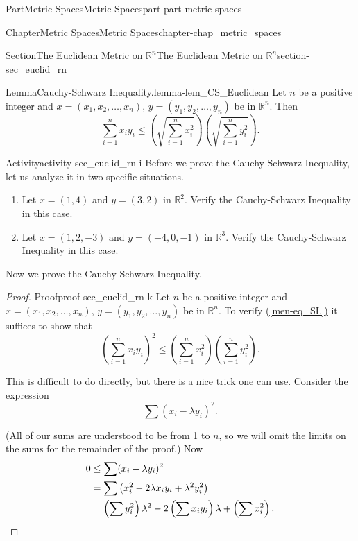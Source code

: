 \documentclass[oneside,10pt,]{book}
\newcommand{\xreffont}{\relax}
\numberwithin{equation}{chapter}
\newcommand{\R}{\mathbb{R}}
\newcommand{\amp}{&}
\begin{document}
\begin{partptx}{Part}{Metric Spaces}{}{Metric Spaces}{}{}{part-part-metric-spaces}
\begin{chapterptx}{Chapter}{Metric Spaces}{}{Metric Spaces}{}{}{chapter-chap_metric_spaces}
\begin{sectionptx}{Section}{The Euclidean Metric on \(\R^n\)}{}{The Euclidean Metric on \(\R^n\)}{}{}{section-sec_euclid_rn}
\begin{lemma}{Lemma}{Cauchy-Schwarz Inequality.}{}{lemma-lem_CS_Euclidean}
Let \(n\) be a positive integer and \(x = (x_1, x_2, \ldots,
x_n)\), \(y=(y_1, y_2, \ldots, y_n)\) be in \(\R^n\). Then%
\begin{equation}
\sum_{i=1}^n x_iy_i \leq  \left(\sqrt{\sum_{i=1}^n x_i^2}\right) \left(\sqrt{\sum_{i=1}^n y_i^2}\right)\text{.}\label{men-eq_SL}
\end{equation}
%
\end{lemma}
\begin{activity}{Activity}{}{activity-sec_euclid_rn-i}%
Before we prove the Cauchy-Schwarz Inequality, let us analyze it in two specific situations.%
\begin{enumerate}[font=\bfseries,label=(\alph*),ref=\alph*]%
\item{}Let \(x=(1,4)\) and \(y = (3,2)\) in \(\R^2\). Verify the Cauchy-Schwarz Inequality in this case.%
\item{}Let \(x=(1,2, -3)\) and \(y = (-4, 0, -1)\) in \(\R^3\). Verify the Cauchy-Schwarz Inequality in this case.%
\end{enumerate}%
\end{activity}%
Now we prove the Cauchy-Schwarz Inequality.%
\begin{proof}{Proof}{}{proof-sec_euclid_rn-k}
Let \(n\) be a positive integer and \(x = (x_1, x_2, \ldots,
x_n)\), \(y=(y_1, y_2, \ldots, y_n)\) be in \(\R^n\). To verify \hyperref[men-eq_SL]{({\xreffont\ref{men-eq_SL}})} it suffices to show that%
\begin{equation*}
\left(\sum_{i=1}^n x_iy_i\right)^2 \leq  \left(\sum_{i=1}^n x_i^2\right) \left(\sum_{i=1}^n y_i^2\right)\text{.}
\end{equation*}
%
\par
This is difficult to do directly, but there is a nice trick one can use. Consider the expression%
\begin{equation*}
\sum (x_i-\lambda y_i)^2\text{.}
\end{equation*}
%
\par
(All of our sums are understood to be from 1 to \(n\), so we will omit the limits on the sums for the remainder of the proof.) Now%
\begin{align}
0 \amp  \leq \sum (x_i-\lambda y_i)^2\notag\\
\amp = \sum \left(x_i^2 - 2\lambda x_iy_i + \lambda^2 y_i^2 \right)\notag\\
\amp = \left( \sum y_i^2 \right)\lambda^2 - 2\left(\sum x_iy_i\right) \lambda + \left(\sum x_i^2\right)\text{.}\label{mrow-eq_SL_1}
\end{align}
%
\par

\end{proof}
\end{sectionptx}
\end{chapterptx}
\end{partptx}
\end{document}
